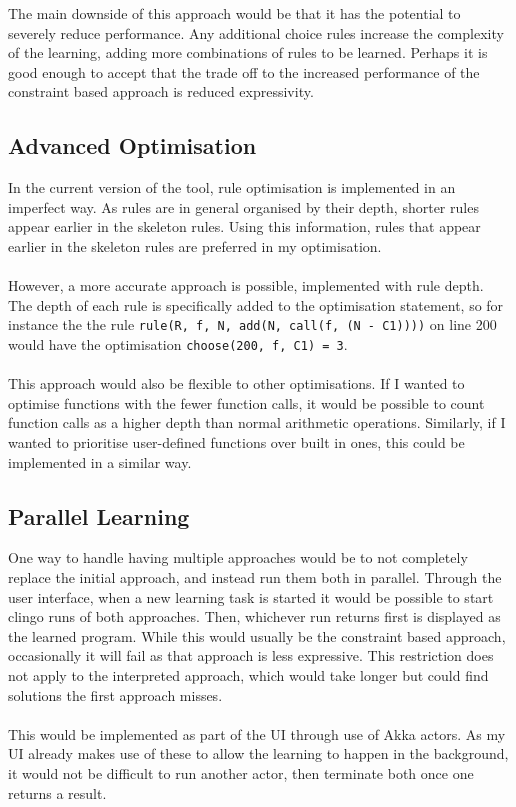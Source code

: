The main downside of this approach would be that it has the potential to severely reduce performance. Any additional choice rules increase the complexity of the learning, adding more combinations of rules to be learned. Perhaps it is good enough to accept that the trade off to the increased performance of the constraint based approach is reduced expressivity. 

\subsection{Advanced Optimisation}
In the current version of the tool, rule optimisation is implemented in an imperfect way. As rules are in general organised by their depth, shorter rules appear earlier in the skeleton rules. Using this information, rules that appear earlier in the skeleton rules are preferred in my optimisation. \\ \\
However, a more accurate approach is possible, implemented with rule depth. The depth of each rule is specifically added to the optimisation statement, so for instance the the rule \lstinline!rule(R, f, N, add(N, call(f, (N - C1))))! on line 200 would have the optimisation \lstinline!choose(200, f, C1) = 3!. \\ \\
This approach would also be flexible to other optimisations. If I wanted to optimise functions with the fewer function calls, it would be possible to count function calls as a higher depth than normal arithmetic operations. Similarly, if I wanted to prioritise user-defined functions over built in ones, this could be implemented in a similar way.

\subsection{Parallel Learning}
One way to handle having multiple approaches would be to not completely replace the initial approach, and instead run them both in parallel. Through the user interface, when a new learning task is started it would be possible to start clingo runs of both approaches. Then, whichever run returns first is displayed as the learned program. While this would usually be the constraint based approach, occasionally it will fail as that approach is less expressive. This restriction does not apply to the interpreted approach, which would take longer but could find solutions the first approach misses. \\ \\
This would be implemented as part of the UI through use of Akka actors. As my UI already makes use of these to allow the learning to happen in the background, it would not be difficult to run another actor, then terminate both once one returns a result.

\pagebreak
%
%